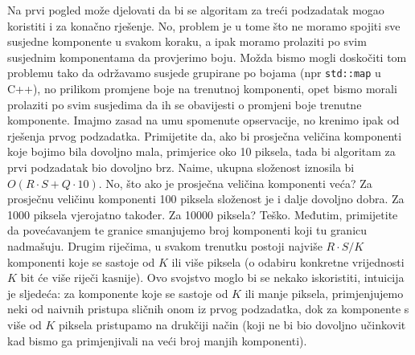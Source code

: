Na prvi pogled može djelovati da bi se algoritam za treći podzadatak mogao
koristiti i za konačno rješenje. No, problem je u tome što ne moramo spojiti
sve susjedne komponente u svakom koraku, a ipak moramo prolaziti po svim
susjednim komponentama da provjerimo boju. Možda bismo mogli doskočiti tom
problemu tako da održavamo susjede grupirane po bojama
(npr \verb|std::map| u C++), no prilikom promjene boje na
trenutnoj komponenti, opet bismo morali prolaziti po svim susjedima da ih se
obavijesti o promjeni boje trenutne komponente. Imajmo zasad na umu spomenute
opservacije, no krenimo ipak od rješenja prvog podzadatka. Primijetite da,
ako bi prosječna veličina komponenti koje bojimo bila dovoljno mala,
primjerice oko 10 piksela, tada bi algoritam za prvi podzadatak bio dovoljno
brz. Naime, ukupna složenost iznosila bi $O(R \cdot S + Q \cdot 10)$. No, što ako je
prosječna veličina komponenti veća? Za prosječnu veličinu komponenti 100
piksela složenost je i dalje dovoljno dobra. Za 1000 piksela vjerojatno
također. Za 10000 piksela? Teško. Međutim, primijetite da povećavanjem te granice
smanjujemo broj komponenti koji tu granicu nadmašuju. Drugim riječima, u
svakom trenutku postoji najviše $R \cdot S / K$ komponenti koje se sastoje od $K$ ili
više piksela (o odabiru konkretne vrijednosti $K$ bit će više riječi kasnije).
Ovo svojstvo moglo bi se nekako iskoristiti, intuicija je sljedeća: za
komponente koje se sastoje od $K$ ili manje piksela, primjenjujemo neki od
naivnih pristupa sličnih onom iz prvog podzadatka, dok za komponente s više
od $K$ piksela pristupamo na drukčiji način (koji ne bi bio dovoljno učinkovit
kad bismo ga primjenjivali na veći broj manjih komponenti).

